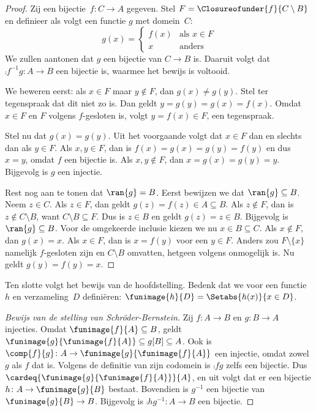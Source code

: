 \documentclass[openany]{memoir}
\begin{document}
\begin{proof}
Zij een bijectie~$f \colon C \to A$ gegeven. Stel $F =
\Closureofunder{f}{C \setminus B}$ en definieer als volgt een functie
$g$ met domein~$C$:
\[
	g(x) =
	\begin{cases}
			f(x) &\text{als $x \in F$}\\
			x & \text{anders}
		\end{cases}
\]
We zullen aantonen dat $g$ een bijectie van $C \to B$ is. Daaruit
volgt dat $\comp{f^{-1}}{g} \colon A \to B$ een bijectie is, waarmee
het bewijs is voltooid.

We beweren eerst: als $x \in F$ maar $y\notin F$, dan $g(x) \neq
g(y)$. Stel ter tegenspraak dat dit niet zo is. Dan geldt $y = g(y) = g(x) =
f(x)$. Omdat $x \in F$ en $F$ volgens 
$f$-gesloten is, volgt $y = f(x) \in F$, een tegenspraak.

Stel nu dat $g(x) = g(y)$. Uit het voorgaande volgt dat $x \in F$ dan
en slechts dan als $y \in F$. Als $x, y \in F$, dan is $f(x) = g (x)
= g(y) = f(y)$ en dus $x = y$, omdat $f$ een bijectie is. Als
$x, y \notin F$, dan $x = g(x) = g(y) = y$. Bijgevolg is $g$ een
injectie.

Rest nog aan te tonen dat $\ran{g} = B$. Eerst bewijzen we dat
$\ran{g} \subseteq B$. Neem $z \in C$. Als $z \in F$, dan geldt
$g(z) = f(z) \in A \subseteq B$. Als $z \notin F$, dan is
$z \notin C \setminus B$, want $C \setminus B \subseteq F$. Dus is
$z \in B$ en geldt $g(z) = z \in B$. Bijgevolg is
$\ran{g} \subseteq B$. Voor de omgekeerde inclusie kiezen we nu
$x \in B \subseteq C$. Als
$x \notin F$, dan $g(x) = x$. Als $x \in F$, dan is $x = f(y)$ voor
een $y \in F$. Anders zou $F \setminus \{x\}$ namelijk $f$-gesloten
zijn en $C\setminus B$ omvatten, hetgeen volgens 
onmogelijk is. Nu geldt $g(y) = f(y) = x$.
\end{proof}

Ten slotte volgt het bewijs van de hoofdstelling. Bedenk dat we voor een
functie~$h$ en verzameling~$D$ definiëren: $\funimage{h}{D} =
\Setabs{h(x)}{x \in D}$.

\begin{proof}[Bewijs van de stelling van Schr\"oder-Bernstein] Zij $f
\colon A \to B$ en $g \colon B \to A$ injecties. Omdat
$\funimage{f}{A} \subseteq B$, geldt
$\funimage{g}{\funimage{f}{A}} \subseteq g[B] \subseteq A$. Ook is
$\comp{f}{g} \colon A \to \funimage{g}{\funimage{f}{A}}$ een
injectie, omdat zowel $g$ als $f$ dat is. Volgens de definitie van zijn
codomein is $\comp{f}{g}$ zelfs een bijectie. Dus
$\cardeq{\funimage{g}{\funimage{f}{A}}}{A}$, en uit
 volgt dat er een bijectie $h \colon A \to
\funimage{g}{B}$ bestaat. Bovendien is $g^{-1}$ een bijectie van
$\funimage{g}{B} \to B$. Bijgevolg is $\comp{h}{g^{-1}} \colon A \to
B$ een bijectie.
\end{proof}
\endgroup
\OLEndChapterHook
\OLEndPartHook
\end{document}
